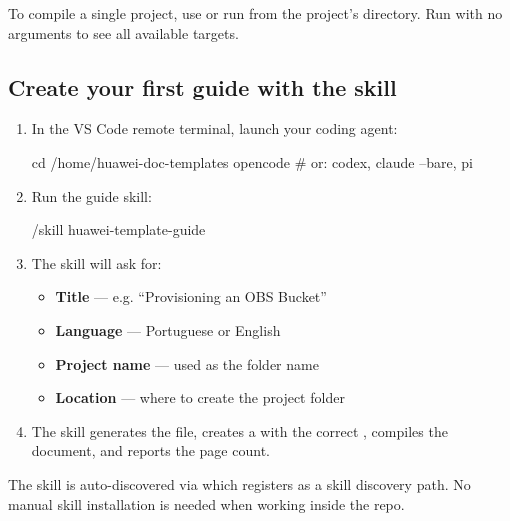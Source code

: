 \documentclass{guide}
\begin{document}
\begin{tip}
To compile a single project, use 
or run  from the project's 
directory. Run  with no arguments to see all available targets.
\end{tip}

\subsection{Create your first guide with the skill}

\stepbystep
\begin{enumerate}
  \item In the VS Code remote terminal, launch your coding agent:

  \begin{code}[bash]
cd /home/huawei-doc-templates
opencode          # or: codex, claude --bare, pi
  \end{code}

  \item Run the guide skill:

  \begin{code}
/skill huawei-template-guide
  \end{code}

  \item The skill will ask for:
    \begin{itemize}
      \item \textbf{Title} — e.g. ``Provisioning an OBS Bucket''
      \item \textbf{Language} — Portuguese or English
      \item \textbf{Project name} — used as the folder name
      \item \textbf{Location} — where to create the project folder
    \end{itemize}

  \item The skill generates the  file, creates a
         with the correct , compiles the
        document, and reports the page count.

\end{enumerate}

\begin{infobox}
The skill is auto-discovered via  which registers
 as a skill discovery path. No manual skill installation
is needed when working inside the repo.
\end{infobox}
\end{document}
